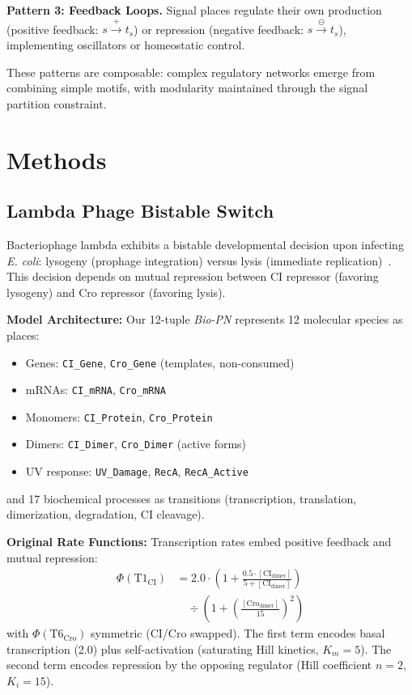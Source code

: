 \documentclass[twocolumn,10pt]{article}
\newcommand{\biopn}{\textit{Bio-PN}}
\begin{document}
\textbf{Pattern 3: Feedback Loops.} Signal places regulate their own production (positive feedback: $s \xrightarrow{+} t_s$) or repression (negative feedback: $s \xrightarrow{\ominus} t_s$), implementing oscillators or homeostatic control.

These patterns are composable: complex regulatory networks emerge from combining simple motifs, with modularity maintained through the signal partition constraint.

\section{Methods}

\subsection{Lambda Phage Bistable Switch}
\label{sec:lambda}

Bacteriophage lambda exhibits a bistable developmental decision upon infecting \textit{E. coli}: lysogeny (prophage integration) versus lysis (immediate replication)~\cite{ptashne2004genetic}. This decision depends on mutual repression between CI repressor (favoring lysogeny) and Cro repressor (favoring lysis).

\textbf{Model Architecture:} Our 12-tuple \biopn{} represents 12 molecular species as places:
\begin{itemize}
\item Genes: \texttt{CI\_Gene}, \texttt{Cro\_Gene} (templates, non-consumed)
\item mRNAs: \texttt{CI\_mRNA}, \texttt{Cro\_mRNA}
\item Monomers: \texttt{CI\_Protein}, \texttt{Cro\_Protein}
\item Dimers: \texttt{CI\_Dimer}, \texttt{Cro\_Dimer} (active forms)
\item UV response: \texttt{UV\_Damage}, \texttt{RecA}, \texttt{RecA\_Active}
\end{itemize}
%
and 17 biochemical processes as transitions (transcription, translation, dimerization, degradation, CI cleavage).

\textbf{Original Rate Functions:} Transcription rates embed positive feedback and mutual repression:
%
\begin{align}
\Phi(\text{T1}_{\text{CI}}) &= 2.0 \cdot \left(1 + \frac{0.5 \cdot [\text{CI}_{\text{dimer}}]}{5 + [\text{CI}_{\text{dimer}}]}\right) \nonumber \\
&\quad \div \left(1 + \left(\frac{[\text{Cro}_{\text{dimer}}]}{15}\right)^2\right) \label{eq:original_CI}
\end{align}
%
with $\Phi(\text{T6}_{\text{Cro}})$ symmetric (CI/Cro swapped). The first term encodes basal transcription (2.0) plus self-activation (saturating Hill kinetics, $K_m=5$). The second term encodes repression by the opposing regulator (Hill coefficient $n=2$, $K_i=15$).
\end{document}
